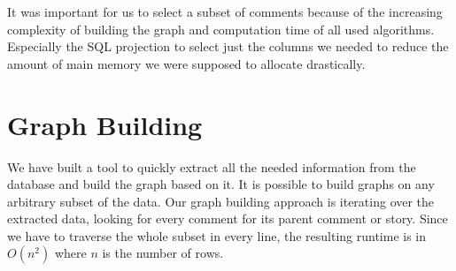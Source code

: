 \documentclass[sigconf]{acmart}
\begin{document}
It was important for us to select a subset of comments because of the increasing complexity of building the graph and computation time of all used algorithms. Especially the SQL projection to select just the columns we needed to reduce the amount of main memory we were supposed to allocate drastically.



\section{Graph Building} \label{graph_building}





We have built a tool to quickly extract all the needed information from the database and build the graph based on it. It is possible to build graphs on any arbitrary subset of the data. 
Our graph building approach is iterating over the extracted data, looking for every comment for its parent comment or story. Since we have to traverse the whole subset in every line, the resulting runtime is in $O(n^{2})$ where $n$ is the number of rows.
\end{document}

